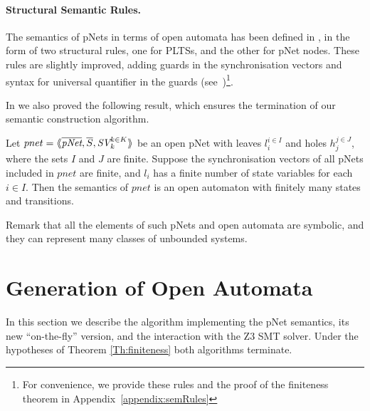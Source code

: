 \documentclass[smallcondensed]{svjour3}
\newcommand{\noteSB}[2][color=green!40, size=\tiny]{\todo[#1]{{\bf
      Note: } {#2}}}
\newcommand{\noteEM}[2][color=blue!40, size=\tiny]{\todo[#1]{{\bf Eric: } {#2}}}
\newcommand{\ie}[1][\ ]{i.e.#1}
\begin{document}
\paragraph{Structural Semantic Rules.}
The semantics of pNets in terms of open automata has been defined in
\cite{henrio:Forte2016}, in the form of two structural rules, one for
PLTSs, and the other for pNet nodes. These rules are slightly improved, adding guards in the synchronisation vectors and syntax for universal quantifier in the guards (see~\cite{Avocs-RR})\footnote{For convenience, we provide these rules and the proof of the finiteness theorem in Appendix~\ref{appendix:semRules}}. 
  
In \cite{henrio:Forte2016} we also proved the following result, which
ensures the termination of our semantic construction algorithm.
\begin{theorem}[Finiteness]
  \label{Th:finiteness}
   Let $pnet=\mylangle \overline{\pNet},\overline{S}, \symb{SV}_k^{k\in K}\myrangle$ be an open pNet  with leaves $l_i^{i\in I}$ and holes $h_j^{j\in
 	J}$, where the sets $I$ and $J$ are finite. Suppose the synchronisation vectors of all pNets 
 included in  $pnet$   are finite, and 
 $l_i $ has a finite number of state variables for each $i\in I$. Then the semantics of $pnet$ is an open automaton 
 with finitely many states and transitions.
\end{theorem}
  Remark that all the elements of such pNets and open automata are symbolic, and they can represent many classes of unbounded systems. 


\section{Generation of Open Automata}
\label{section:implementation}
In this section we describe the algorithm implementing the pNet
semantics, its new ``on-the-fly'' version, and the interaction with the
Z3 SMT solver. Under the hypotheses of Theorem \ref{Th:finiteness} 
both algorithms terminate. 

\end{document}
